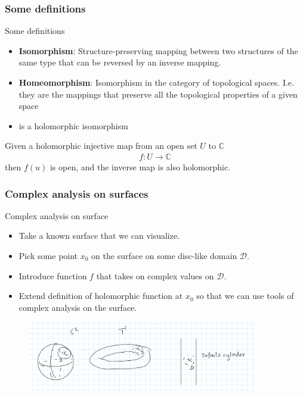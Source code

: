 \documentclass{beamer}[10]
\begin{document}
\begin{frame}
	\frametitle{Some definitions}
	\begin{block}{Some definitions}
	\begin{itemize}
		\item \textbf{Isomorphism}: Structure-preserving mapping between two structures of the same type that can be reversed by an inverse mapping.
		\item \textbf{Homeomorphism}: Isomorphism in the category of topological spaces. I.e. they are the mappings that preserve all the topological properties of a given space
		\item  {} is a holomorphic isomorphism
	\end{itemize}
Given a holomorphic injective map from an open set $U$ to $\mathds{C}$
\begin{equation}
	\begin{aligned}
		f:U \to \mathds{C}
	\end{aligned}
\end{equation}
then $f(u)$ is open, and the inverse map is also holomorphic.
	\end{block}
\end{frame}

\begin{frame}
	\frametitle{Complex analysis on surfaces}
	\begin{block}{Complex analysis on surface}
		\begin{itemize}
			\item Take a known surface that we can visualize.
			\item Pick some point $x_0$ on the surface on some disc-like domain $\mathcal{D}$.
			\item Introduce function $f$ that takes on complex values on $\mathcal{D}$.
			\item Extend definition of holomorphic function at $x_0$ so that we can use tools of complex analysis on the surface.
		\end{itemize}
	\end{block}
\begin{figure}
	\includegraphics[width=10cm]{2.PNG}
\end{figure}
\end{frame}
\end{document}
